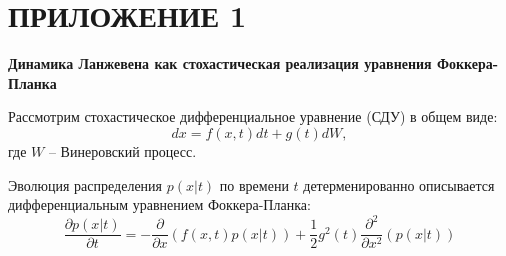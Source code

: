 {\NonNumberedSection\section*{ПРИЛОЖЕНИЕ 1}}
\pagestyle{supplement1}
\label{AppendixA}

\textbf{Динамика Ланжевена как стохастическая реализация уравнения Фоккера-Планка}

Рассмотрим стохастическое дифференциальное уравнение (СДУ) в общем виде:
\[
    dx = f(x, t)dt + g(t) dW,
\]
где $W$ -- Винеровский процесс. 

\begin{theorem}
    Эволюция распределения $p(x|t)$ по времени $t$ детерменированно описывается дифференциальным уравнением Фоккера-Планка:
    \[
        \dfrac{\partial p(x|t)}{\partial t} = -\dfrac{\partial }{\partial x} \left(f\left(x,t\right)p(x|t) \right) + \dfrac{1}{2}g^2 (t) \dfrac{\partial^2}{\partial x^2} \left(p(x|t)\right)
    \]
\end{theorem}

